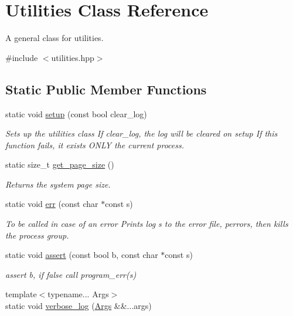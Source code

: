 \hypertarget{class_utilities}{}\section{Utilities Class Reference}
\label{class_utilities}


A general class for utilities.  




{\ttfamily \#include $<$utilities.\+hpp$>$}

\subsection*{Static Public Member Functions}
\begin{DoxyCompactItemize}
\item 
static void \hyperlink{class_utilities_aa448e199bdc43fe62e9b9b989a7f667b}{setup} (const bool clear\+\_\+log)
\begin{DoxyCompactList}\small\item\em Sets up the utilities class If clear\+\_\+log, the log will be cleared on setup If this function fails, it exists {\itshape O\+N\+LY} the current process. \end{DoxyCompactList}\item 
static size\+\_\+t \hyperlink{class_utilities_a4c14339a4ea155685e379f750fba3806}{get\+\_\+page\+\_\+size} ()
\begin{DoxyCompactList}\small\item\em Returns the system page size. \end{DoxyCompactList}\item 
static void \hyperlink{class_utilities_a5308da50597c93aad2b1ca2ecfbcb723}{err} (const char $\ast$const s)
\begin{DoxyCompactList}\small\item\em To be called in case of an error Prints log s to the error file, perrors, then kills the process group. \end{DoxyCompactList}\item 
static void \hyperlink{class_utilities_a22c85a2970e168ca0b9ad6fd86752792}{assert} (const bool b, const char $\ast$const s)
\begin{DoxyCompactList}\small\item\em assert b, if false call program\+\_\+err(s) \end{DoxyCompactList}\item 
{\footnotesize template$<$typename... Args$>$ }\\static void \hyperlink{class_utilities_ad7251bf1dd140719a5ff384d81dc4ac0}{verbose\+\_\+log} (\hyperlink{struct_args}{Args} \&\&...args)

\end{DoxyCompactItemize}

